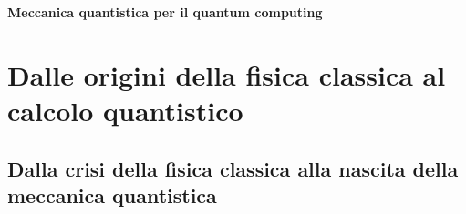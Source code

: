 \documentclass[a4paper,12pt]{report}
\theoremstyle{plain}
\begin{document}
\begin{titlepage}
  \thispagestyle{prima}
  \centering
  \vspace*{5cm}
  {\Huge\bfseries Meccanica quantistica per il quantum computing\par}
  \vfill
\end{titlepage}


\tableofcontents
\newpage

\chapter{Dalle origini della fisica classica al calcolo quantistico}
\section{Dalla crisi della fisica classica alla nascita della meccanica quantistica}
\end{document}
